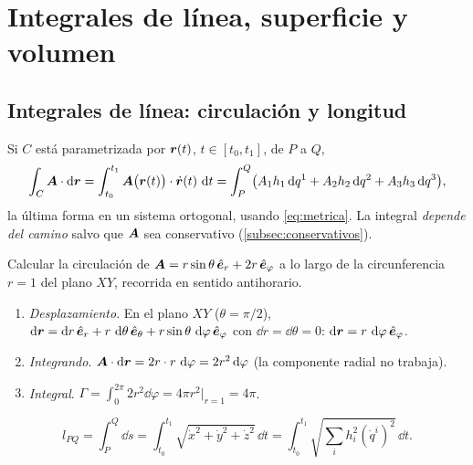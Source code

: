 \section{Integrales de línea, superficie y volumen}
\label{sec:integrales}

\subsection{Integrales de línea: circulación y longitud}

\begin{proposicion}
\label{prop:linea}
Si $C$ está parametrizada por $\bm{r}(t)$, $t\in[t_{0},t_{1}]$, de $P$ a $Q$,
\begin{equation}
  \int_{C}\bm{A}\cdot\mathop{}\!\mathrm{d}\bm{r}=\int_{t_{0}}^{t_{1}}\bm{A}\bigl(\bm{r}(t)\bigr)\cdot\dot{\bm{r}}(t)\,\mathop{}\!\mathrm{d} t
  =\int_{P}^{Q}\bigl(A_{1}h_{1}\mathop{}\!\mathrm{d} q^{1}+A_{2}h_{2}\mathop{}\!\mathrm{d} q^{2}+A_{3}h_{3}\mathop{}\!\mathrm{d} q^{3}\bigr),
  \label{eq:linea}
\end{equation}
la última forma en un sistema ortogonal, usando \eqref{eq:metrica}. La
integral \emph{depende del camino} salvo que $\bm{A}$ sea conservativo
(\cref{subsec:conservativos}).
\end{proposicion}

\begin{ejemplo}
\label{ej:circulacion}
Calcular la circulación de $\bm{A}=r\sin\theta\,\hat{\bm{e}}_{r}+2r\,\hat{\bm{e}}_{\varphi}$ a lo largo de
la circunferencia $r=1$ del plano $XY$, recorrida en sentido antihorario.
\begin{enumerate}
  \item \emph{Desplazamiento}. En el plano $XY$ ($\theta=\pi/2$),
        $\mathop{}\!\mathrm{d}\bm{r}=\mathop{}\!\mathrm{d} r\,\hat{\bm{e}}_{r}+r\,\mathop{}\!\mathrm{d}\theta\,\hat{\bm{e}}_{\theta}+r\sin\theta\,\mathop{}\!\mathrm{d}\varphi\,\hat{\bm{e}}_{\varphi}$ con
        $\dd r=\dd\theta=0$: $\mathop{}\!\mathrm{d}\bm{r}=r\,\mathop{}\!\mathrm{d}\varphi\,\hat{\bm{e}}_{\varphi}$.
  \item \emph{Integrando}. $\bm{A}\cdot\mathop{}\!\mathrm{d}\bm{r}=2r\cdot r\,\mathop{}\!\mathrm{d}\varphi=2r^{2}\mathop{}\!\mathrm{d}\varphi$
        (la componente radial no trabaja).
  \item \emph{Integral}. $\Gamma=\displaystyle\int_{0}^{2\pi}2r^{2}\dd\varphi=4\pi r^{2}\big|_{r=1}=4\pi$.
\end{enumerate}
\end{ejemplo}

\begin{proposicion}
\begin{equation}
  l_{PQ}=\int_{P}^{Q}\dd s=\int_{t_{0}}^{t_{1}}\sqrt{\dot x^{2}+\dot y^{2}+\dot z^{2}}\,\dd t
  =\int_{t_{0}}^{t_{1}}\sqrt{\textstyle\sum_{i}h_{i}^{2}(\dot q^{i})^{2}}\,\dd t .
  \label{eq:longitud}
\end{equation}
\end{proposicion}

